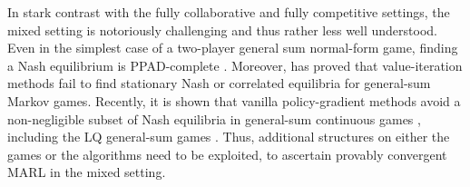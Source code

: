 In stark contrast with the fully  collaborative  and fully competitive settings, the mixed setting is notoriously challenging and thus  rather less well understood. 
Even in the simplest case of a  two-player general sum normal-form game, finding a  Nash  equilibrium is PPAD-complete \cite{chen2009settling}.   
Moreover, \cite{zinkevich2006cyclic} has proved  that value-iteration methods fail to find stationary Nash or correlated equilibria for general-sum Markov games.  Recently,   it is shown that vanilla  policy-gradient   methods avoid a non-negligible subset of   Nash equilibria in 
  general-sum continuous games \cite{mazumdar2018convergence},  including the  LQ general-sum games \cite{mazumdar2019policy}.   
Thus,  additional structures on either the games or the algorithms   
need to be exploited, to ascertain provably convergent MARL in the mixed setting. 


\vspace{6pt}
\vspace{3pt} 
 
